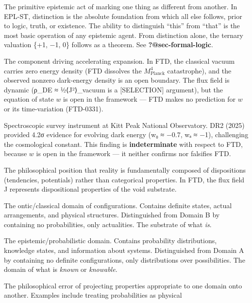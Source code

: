 \documentclass[
  11pt,
  letterpaper,
  twoside,
  openany]{book}
\providecommand{\tightlist}{%
  \setlength{\itemsep}{0pt}\setlength{\parskip}{0pt}}
\begin{document}
\begin{description}
\tightlist
\item[\textbf{Distinction}]
The primitive epistemic act of marking one thing as different from
another. In EPL-ST, distinction is the absolute foundation from which
all else follows, prior to logic, truth, or existence. The ability to
distinguish ``this'' from ``that'' is the most basic operation of any
epistemic agent. From distinction alone, the ternary valuation \{+1, −1,
0\} follows as a theorem. See \textbf{?@sec-formal-logic}.
\item[\textbf{Dark Energy}]
The component driving accelerating expansion. In FTD, the classical
vacuum carries zero energy density (FTD dissolves the
\(M_\text{Planck}^4\) catastrophe), and the observed nonzero dark-energy
density is an open boundary. The flux field is dynamic (ρ\_DE ≈
½⟨J²⟩\_vacuum is a {[}SELECTION{]} argument), but the equation of state
\(w\) is open in the framework --- FTD makes no prediction for \(w\) or
its time-variation (FTD-0331).
\item[\textbf{Dark Energy Spectroscopic Instrument (DESI)}]
Spectroscopic survey instrument at Kitt Peak National Observatory. DR2
(2025) provided 4.2σ evidence for evolving dark energy (w₀ ≈ −0.7, wₐ ≈
−1), challenging the cosmological constant. This finding is
\textbf{indeterminate} with respect to FTD, because \(w\) is open in the
framework --- it neither confirms nor falsifies FTD.
\item[\textbf{Dispositional Ontology}]
The philosophical position that reality is fundamentally composed of
dispositions (tendencies, potentials) rather than categorical
properties. In FTD, the flux field J represents dispositional properties
of the void substrate.
\item[\textbf{Domain A (𝒜)}]
The ontic/classical domain of configurations. Contains definite states,
actual arrangements, and physical structures. Distinguished from Domain
B by containing no probabilities, only actualities. The substrate of
what \emph{is}.
\item[\textbf{Domain B (ℬ)}]
The epistemic/probabilistic domain. Contains probability distributions,
knowledge states, and information about systems. Distinguished from
Domain A by containing no definite configurations, only distributions
over possibilities. The domain of what is \emph{known} or
\emph{knowable}.
\item[\textbf{Domain Confusion}]
The philosophical error of projecting properties appropriate to one
domain onto another. Examples include treating probabilities as physical

\end{description}
\end{document}
